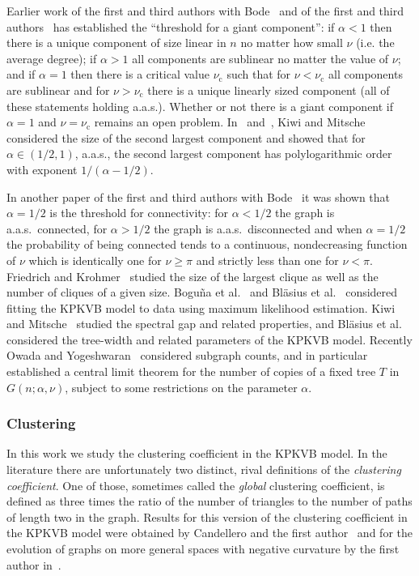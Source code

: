 Earlier work of the first and third authors with Bode~\cite{bode2015largest} and of the first and third authors~\cite{fountoulakis2018law} has established the ``threshold for a giant component'': if $\alpha < 1$ then there is a unique component of size linear in $n$ no matter how small $\nu$ (i.e. the average degree); if $\alpha > 1$ all components are sublinear no matter the value of $\nu$; and if $\alpha=1$ then there is a critical value $\nu_{\text{c}}$ such that for $\nu < \nu_{\text{c}}$ all components are sublinear and for $\nu > \nu_{\text{c}}$ there is a unique linearly sized component (all of these statements holding a.a.s.). Whether or not there is a giant component if $\alpha=1$ and $\nu=\nu_{\text{c}}$ remains an open problem. In~\cite{kiwi2015bound} and~\cite{kiwi2017second}, Kiwi and Mitsche considered the size of the second largest component and showed that for $\alpha \in (1/2, 1)$, a.a.s., the second largest component has polylogarithmic order with exponent $1/(\alpha -1/2)$.


In another paper of the first and third authors with Bode~\cite{bode2016probability} it was shown that $\alpha=1/2$ is the threshold for connectivity: for $\alpha < 1/2$ the graph is a.a.s.~connected, for $\alpha>1/2$ the graph is a.a.s.~disconnected and when $\alpha=1/2$ the probability of being connected tends to a continuous, nondecreasing function of $\nu$ which is identically one for $\nu \geq \pi$ and strictly less than one for $\nu < \pi$. Friedrich and Krohmer~\cite{blasius2018cliques} studied the size of the largest clique as well as the number of cliques of a given size. Bogu\~{n}a et al.~\cite{boguna2010sustaining} and Bl\"asius et al.~\cite{BlasiusMLE} considered fitting the KPKVB model to data using maximum likelihood estimation. Kiwi and Mitsche~\cite{kiwi2018spectral} studied the spectral gap and related properties, and Bl\"asius et al.\cite{blasius2016hyperbolic} considered the tree-width and related parameters of the KPKVB model. Recently Owada and Yogeshwaran~\cite{owada2018sub} considered subgraph counts, and in particular established a central limit theorem for the number of copies of a fixed tree $T$ in $G(n;\alpha,\nu)$, subject to some restrictions on the parameter $\alpha$.

\subsubsection*{Clustering}

In this work we study the clustering coefficient in the KPKVB model. In the literature there are unfortunately two distinct, rival definitions of the {\em clustering coefficient}. One of those, sometimes called the {\em global} clustering coefficient, is defined as three times the ratio of the number of triangles to the number of paths of length two in the graph. Results for this version of the clustering coefficient in the KPKVB model were obtained by Candellero and the first author~\cite{candellero2016clustering} and for the evolution of graphs on more general spaces with negative curvature by the first author in~\cite{fountoulakis2012evolution}. 

